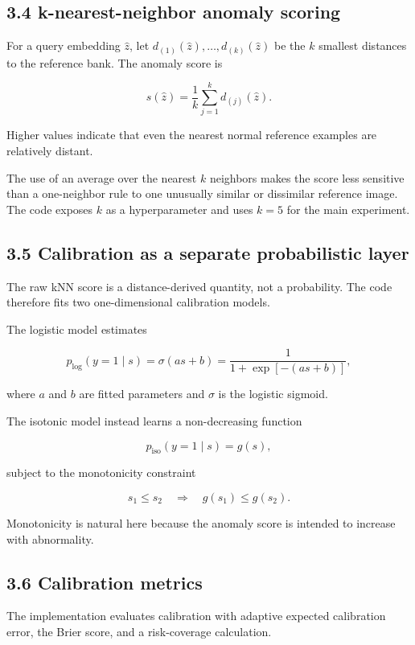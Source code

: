 \documentclass[
  11pt,
]{article}
\begin{document}
\subsection{3.4 k-nearest-neighbor anomaly
scoring}\label{k-nearest-neighbor-anomaly-scoring}

For a query embedding \(\hat z\), let
\(d_{(1)}(\hat z),\ldots,d_{(k)}(\hat z)\) be the \(k\) smallest
distances to the reference bank. The anomaly score is

\[
s(\hat z)
=
\frac{1}{k}
\sum_{j=1}^{k}
d_{(j)}(\hat z).
\]

Higher values indicate that even the nearest normal reference examples
are relatively distant.

The use of an average over the nearest \(k\) neighbors makes the score
less sensitive than a one-neighbor rule to one unusually similar or
dissimilar reference image. The code exposes \(k\) as a hyperparameter
and uses \(k=5\) for the main experiment.

\subsection{3.5 Calibration as a separate probabilistic
layer}\label{calibration-as-a-separate-probabilistic-layer}

The raw kNN score is a distance-derived quantity, not a probability. The
code therefore fits two one-dimensional calibration models.

The logistic model estimates

\[
p_{\mathrm{log}}(y=1\mid s)
=
\sigma(as+b)
=
\frac{1}{1+\exp[-(as+b)]},
\]

where \(a\) and \(b\) are fitted parameters and \(\sigma\) is the
logistic sigmoid.

The isotonic model instead learns a non-decreasing function

\[
p_{\mathrm{iso}}(y=1\mid s)=g(s),
\]

subject to the monotonicity constraint

\[
s_1\le s_2
\quad\Rightarrow\quad
g(s_1)\le g(s_2).
\]

Monotonicity is natural here because the anomaly score is intended to
increase with abnormality.

\subsection{3.6 Calibration metrics}\label{calibration-metrics}

The implementation evaluates calibration with adaptive expected
calibration error, the Brier score, and a risk-coverage calculation.
\end{document}
